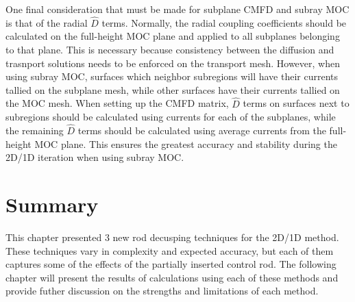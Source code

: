 One final consideration that must be made for subplane CMFD and subray MOC is that of the radial $\hat{D}$ terms.  Normally, the radial coupling coefficients should be calculated on the full-height MOC plane and applied to all subplanes belonging to that plane.  This is necessary because consistency between the diffusion and trasnport solutions needs to be enforced on the transport mesh.  However, when using subray MOC, surfaces which neighbor subregions will have their currents tallied on the subplane mesh, while other surfaces have their currents tallied on the MOC mesh.  When setting up the CMFD matrix, $\hat{D}$ terms on surfaces next to subregions should be calculated using currents for each of the subplanes, while the remaining $\hat{D}$ terms should be calculated using average currents from the full-height MOC plane.  This ensures the greatest accuracy and stability during the 2D/1D iteration when using subray MOC.

\section{Summary}

This chapter presented 3 new rod decusping techniques for the 2D/1D method.  These techniques vary in complexity and expected accuracy, but each of them captures some of the effects of the partially inserted control rod.  The following chapter will present the results of calculations using each of these methods and provide futher discussion on the strengths and limitations of each method.
